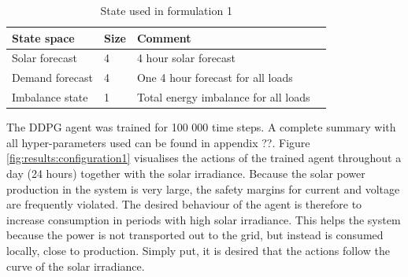 \documentclass[class=book, crop=false]{standalone}
\begin{document}
\begin{table}[ht]
\centering
\begin{tabular}{l|lll}

State space  & Size & Comment
\\ 
\hline
Solar forecast      &  4  &  4 hour solar forecast
\\ 

Demand forecast    &4 & One 4 hour forecast for all loads
\\ 
Imbalance state & 1  & Total energy imbalance for all loads
\\
\hline
\end{tabular}
\caption{State used in formulation 1}
\label{table:results:state_formulation1}
\end{table}
The DDPG agent was trained for 100 000 time steps. A complete summary with all hyper-parameters used can be found in appendix ??. Figure \ref{fig:results:configuration1} visualises the actions of the trained agent throughout a day (24 hours) together with the solar irradiance. Because the solar power production in the system is very large, the safety margins for current and voltage are frequently violated. The desired behaviour of the agent is therefore to increase consumption in periods with high solar irradiance. This helps the system because the power is not transported out to the grid, but instead is consumed locally, close to production. Simply put, it is desired that the actions follow the curve of the solar irradiance. 
\end{document}
